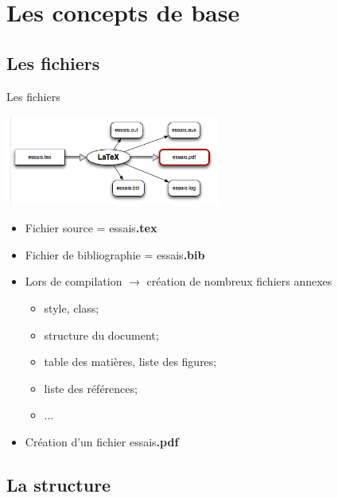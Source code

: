 \documentclass[10pt,svgnames,usenames,table]{beamer} %
\begin{document}
\section{Les concepts de base}
\subsection{Les fichiers}

\begin{frame}{Les fichiers}

	\begin{center}
		\includegraphics[height=3cm]{compilation.jpg}
	\end{center}

	\begin{itemize}
		\item Fichier source = essais\alert{\textbf{.tex}}
		\item Fichier de bibliographie = essais\alert{\textbf{.bib}}
		\item Lors de compilation $\rightarrow$ création de nombreux fichiers annexes
		\begin{itemize}
			\item style, class;
			\item structure du document;
			\item table des matières, liste des figures;
			\item liste des références;
			\item ...
		\end{itemize}
		\item Création d'un fichier essais\alert{\textbf{.pdf}}
	\end{itemize}
\end{frame}

\subsection{La structure}
\end{document}

